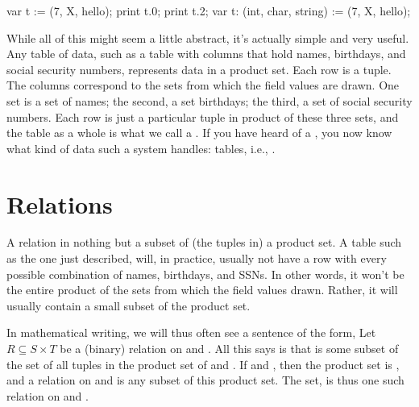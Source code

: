 \documentclass[letterpaper,10pt,english]{sphinxmanual}
\begin{document}
\begin{sphinxVerbatim}[commandchars=\\\{\}]
var t := (7, \PYGZsq{}X\PYGZsq{}, \PYGZdq{}hello\PYGZdq{});
print t.0;
print t.2;
var t\PYGZsq{}: (int, char, string) := (7, \PYGZsq{}X\PYGZsq{}, \PYGZdq{}hello\PYGZdq{});
\end{sphinxVerbatim}

While all of this might seem a little abstract, it’s actually simple
and very useful. Any table of data, such as a table with columns that
hold names, birthdays, and social security numbers, represents data in
a product set. Each row is a tuple. The columns correspond to the sets
from which the field values are drawn. One set is a set of names; the
second, a set birthdays; the third, a set of social security numbers.
Each row is just a particular tuple in product of these three sets,
and the table as a whole is what we call a . If you have
heard of a , you now know what kind of data such
a system handles: tables, i.e., .


\section{Relations}
\label{\detokenize{07-set-theory:relations}}
A relation in nothing but a subset of (the tuples in) a product set. A
table such as the one just described, will, in practice, usually not
have a row with every possible combination of names, birthdays, and
SSNs. In other words, it won’t be the entire product of the sets from
which the field values drawn. Rather, it will usually contain a small
subset of the product set.

In mathematical writing, we will thus often see a sentence of the
form, Let \(R \subseteq S \times T\) be a (binary) relation on 
and . All this says is that  is some subset of the set of all
tuples in the product set of  and . If  and
, then the product set is , and a relation on  and  is any
subset of this product set.  The set,  is
thus one such relation on  and .
\end{document}

